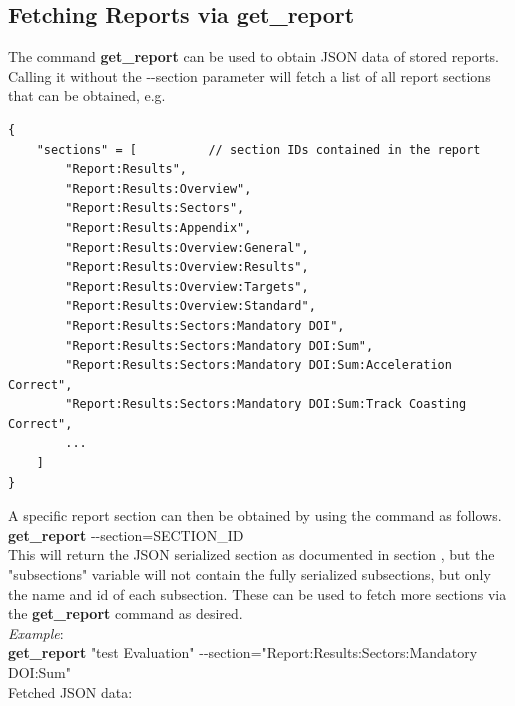 \subsection{Fetching Reports via get\_report}
\label{sec:get_report}

The command \textbf{get\_report} can be used to obtain JSON data of stored reports. \\

Calling it without the -{}-section parameter will fetch a list of all report sections that can be obtained, e.g.

\begin{lstlisting}[basicstyle=\tiny\ttfamily]
{
    "sections" = [          // section IDs contained in the report
        "Report:Results",
        "Report:Results:Overview",
        "Report:Results:Sectors",
        "Report:Results:Appendix",
        "Report:Results:Overview:General",
        "Report:Results:Overview:Results",
        "Report:Results:Overview:Targets",
        "Report:Results:Overview:Standard",
        "Report:Results:Sectors:Mandatory DOI",
        "Report:Results:Sectors:Mandatory DOI:Sum",
        "Report:Results:Sectors:Mandatory DOI:Sum:Acceleration Correct",
        "Report:Results:Sectors:Mandatory DOI:Sum:Track Coasting Correct",
        ...
    ]
}
\end{lstlisting}

A specific report section can then be obtained by using the command as follows. \\

\textbf{get\_report} -{}-section=SECTION\_ID \\

This will return the JSON serialized section as documented in section ,
but the "subsections" variable will not contain the fully serialized subsections,
but only the name and id of each subsection. These can be used to fetch more sections 
via the \textbf{get\_report} command as desired. \\

\textit{Example}: \\

\textbf{get\_report} "test Evaluation" -{}-section="Report:Results:Sectors:Mandatory DOI:Sum" \\

Fetched JSON data: \\

